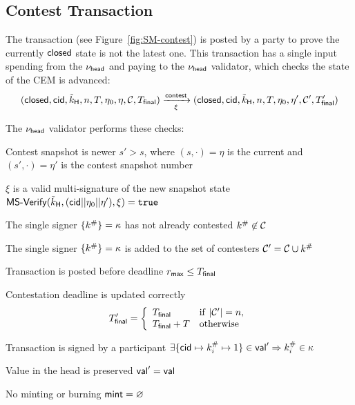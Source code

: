 \subsection{Contest Transaction}\label{sec:contest-tx}

The \mtxContest{} transaction (see Figure~\ref{fig:SM-contest}) is posted
by a party to prove the currently $\mathsf{closed}$ state is not the latest one. This
transaction has a single input spending from the $\nu_\mathsf{head}$ and paying to the
$\nu_\mathsf{head}$ validator, which checks the state of the CEM is advanced:
\[
	(\mathsf{closed},\mathsf{cid},\tilde{k}_{\mathsf{H}},n,T,\eta_0,\eta,\mathcal{C},T_{\mathsf{final}}) \xrightarrow[\xi]{\mathsf{contest}} (\mathsf{closed},\mathsf{cid},\tilde{k}_{\mathsf{H}},n,T,\eta_0,\eta',\mathcal{C}',T_{\mathsf{final}}')
\]

\begin{samepage}
	\noindent The $\nu_\mathsf{head}$ validator performs these checks:
	\begin{menumerate}
		\item Contest snapshot is newer $s' > s$, where $(s, \cdot) = \eta$ is the current and $(s', \cdot) = \eta'$ is the contest snapshot number
		\item $\xi$ is a valid multi-signature of the new snapshot state
		$\mathsf{MS\textsf{-}{}Verify}(\tilde{k}_{\mathsf{H}},(\mathsf{cid} || \eta_{0} || \eta'),\xi) = \mathtt{true}$
		\item The single signer $\{k^{\#}\} = \kappa$ has not already contested $k^{\#} \not\in \mathcal{C}$
		\item The single signer $\{k^{\#}\} = \kappa$ is added to the set of contesters $\mathcal{C}' = \mathcal{C} \cup k^{\#}$
		\item Transaction is posted before deadline $r_{\mathsf{max}} \leq T_{\mathsf{final}}$
		\item Contestation deadline is updated correctly
		\[
			T_{\mathsf{final}}' = \left\{\begin{array}{ll}
				T_{\mathsf{final}}     & \mathrm{if} ~ |\mathcal{C}'| = n, \\
				T_{\mathsf{final}} + T & \mathrm{otherwise}
			\end{array}\right.
		\]
		\item Transaction is signed by a participant $\exists \{\mathsf{cid} \mapsto k^{\#}_{i} \mapsto 1\} \in \mathsf{val}' \Rightarrow k^{\#}_{i} \in \kappa$
		\item Value in the head is preserved $\mathsf{val}' = \mathsf{val}$
		\item No minting or burning $\mathsf{mint} = \varnothing$
	\end{menumerate}
\end{samepage}

